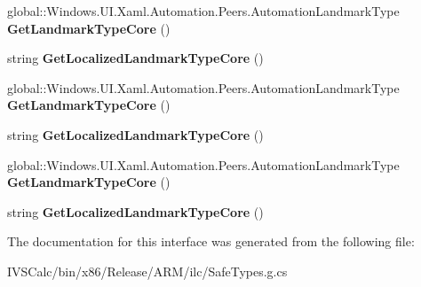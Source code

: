 \begin{DoxyCompactItemize}
\mbox{\label{interface_windows_1_1_u_i_1_1_xaml_1_1_automation_1_1_peers_1_1_i_automation_peer_overrides4_ab72b9abc3b22efb936250afa1ae83f6a}} 
global\+::\+Windows.\+U\+I.\+Xaml.\+Automation.\+Peers.\+Automation\+Landmark\+Type {\bfseries Get\+Landmark\+Type\+Core} ()
\item 
\mbox{\label{interface_windows_1_1_u_i_1_1_xaml_1_1_automation_1_1_peers_1_1_i_automation_peer_overrides4_a8c93f185684f9362a33aa40fc5ec098a}} 
string {\bfseries Get\+Localized\+Landmark\+Type\+Core} ()
\item 
\mbox{\label{interface_windows_1_1_u_i_1_1_xaml_1_1_automation_1_1_peers_1_1_i_automation_peer_overrides4_ab72b9abc3b22efb936250afa1ae83f6a}} 
global\+::\+Windows.\+U\+I.\+Xaml.\+Automation.\+Peers.\+Automation\+Landmark\+Type {\bfseries Get\+Landmark\+Type\+Core} ()
\item 
\mbox{\label{interface_windows_1_1_u_i_1_1_xaml_1_1_automation_1_1_peers_1_1_i_automation_peer_overrides4_a8c93f185684f9362a33aa40fc5ec098a}} 
string {\bfseries Get\+Localized\+Landmark\+Type\+Core} ()
\item 
\mbox{\label{interface_windows_1_1_u_i_1_1_xaml_1_1_automation_1_1_peers_1_1_i_automation_peer_overrides4_ab72b9abc3b22efb936250afa1ae83f6a}} 
global\+::\+Windows.\+U\+I.\+Xaml.\+Automation.\+Peers.\+Automation\+Landmark\+Type {\bfseries Get\+Landmark\+Type\+Core} ()
\item 
\mbox{\label{interface_windows_1_1_u_i_1_1_xaml_1_1_automation_1_1_peers_1_1_i_automation_peer_overrides4_a8c93f185684f9362a33aa40fc5ec098a}} 
string {\bfseries Get\+Localized\+Landmark\+Type\+Core} ()
\end{DoxyCompactItemize}


The documentation for this interface was generated from the following file\+:\begin{DoxyCompactItemize}
\item 
I\+V\+S\+Calc/bin/x86/\+Release/\+A\+R\+M/ilc/Safe\+Types.\+g.\+cs\end{DoxyCompactItemize}
